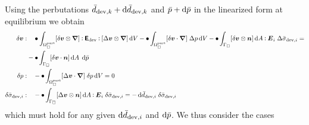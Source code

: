 \documentclass[a4paper]{article}
\newcommand{\particle}{\mathrm{part}}
\begin{document}
Using the perbutations $\bar{d}_{\mathrm{dev},k} + \operatorname{d \!}\bar{d}_{\mathrm{dev},k}$ and $\bar{p} + \operatorname{d \!}\bar{p}$ in the linearized form at equilibrium we obtain
\begin{align}
 \delta\ta v :&\quad 
 \bullet \int_{\Omega_\Box^\particle} [\delta\ta v\outerp\diff] \dprod \tf E_\dev \dprod [\Delta\ta v\outerp\diff] \dif V - \bullet\int_{\Omega_\Box^\particle} [\delta\ta v\cdot\diff]\;\Delta p \dif V 
  -\bullet \int_{\Gamma_\Box} [\delta\ta v\outerp\ta n] \dif A\dprod \ts E_i\;\Delta\bar{\sigma}_{\dev,i}
  = \nonumber\\&-\bullet\int_{\Gamma_\Box}[\delta\ta v\cdot \ta n]\dif A\;\dif\bar{p}
 \\
 \delta p :&\quad 
 -\bullet \int_{\Omega_\Box^\particle} [\Delta\ta v\cdot\diff]\;\delta p\dif V = 0
 \\
 \delta\bar{\sigma}_{\dev,i} :&\quad
 -\bullet\int_{\Gamma_\Box} [\Delta\ta v \outerp \ta n] \dif A \dprod \ts E_i \;\delta\bar{\sigma}_{\dev,i} = -\dif\bar{d}_{\dev,i} \; \delta\bar{\sigma}_{\dev,i}
\end{align}
which must hold for any given $\operatorname{d \!}\bar{d}_{\mathrm{dev},i}$ and $\operatorname{d \!}\bar{p}$. We thus consider the cases
\end{document}

